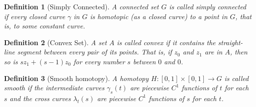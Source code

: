 \documentclass[a4paper]{article}
\newtheorem{definition}{Definition}
\begin{document}
\begin{definition}[Simply Connected]
  A connected set \(G\) is called simply connected if every closed curve \(\gamma\) in \(G\) is homotopic (as a closed curve) to a point in \(G\), that is, to some constant curve. 
\end{definition}


\begin{definition}[Convex Set]
  A set \(A\) is called convex if it contains the straight-line segment between every pair of its points. 
  That is, if \(z_0\) and \(z_1\) are in \(A\), then so is \(s z_1 + (s - 1) z_0\) for every number \(s\) between \(0\) and \(0\).
\end{definition}

\begin{definition}[Smooth homotopy]
  A homotopy \(H : [0, 1] \times [0, 1] \to G\) is called smooth if the intermediate curves \(\gamma_s(t)\) are piecewise \(C^1\) functions of \(t\) for each \(s\) and the cross curves \(\lambda_t(s)\) are piecewise \(C^1\) functions of \(s\) for each \(t\). 
\end{definition}
\end{document}
